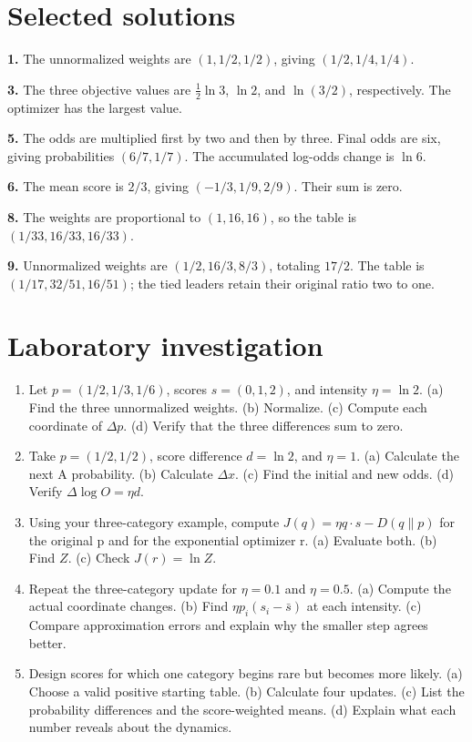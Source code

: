 \documentclass[11pt,oneside,openany]{book}
\theoremstyle{definition}
\theoremstyle{remark}
\numberwithin{equation}{chapter}
\providecommand{\tightlist}{\setlength{\itemsep}{0pt}\setlength{\parskip}{0pt}}
\newcommand{\labheading}{\FloatBarrier\section*{Laboratory investigation}\addcontentsline{toc}{section}{Laboratory investigation}}
\begin{document}
\section{Selected solutions}\label{ch09-selected-solutions}

\textbf{1.} The unnormalized weights are \((1,1/2,1/2)\), giving \((1/2,1/4,1/4)\).

\textbf{3.} The three objective values are \(\tfrac12\ln3\), \(\ln2\), and \(\ln(3/2)\), respectively. The optimizer has the largest value.

\textbf{5.} The odds are multiplied first by two and then by three. Final odds are six, giving probabilities \((6/7,1/7)\). The accumulated log-odds change is \(\ln6\).

\textbf{6.} The mean score is \(2/3\), giving \((-1/3,1/9,2/9)\). Their sum is zero.

\textbf{8.} The weights are proportional to \((1,16,16)\), so the table is \((1/33,16/33,16/33)\).

\textbf{9.} Unnormalized weights are \((1/2,16/3,8/3)\), totaling \(17/2\). The table is \((1/17,32/51,16/51)\); the tied leaders retain their original ratio two to one.
\labheading\begin{enumerate}
\def\labelenumi{\arabic{enumi}.}
\tightlist
\item
  Let \(p=(1/2,1/3,1/6)\), scores \(s=(0,1,2)\), and intensity \(\eta=\ln2\). (a) Find the three unnormalized weights. (b) Normalize. (c) Compute each coordinate of \(\Delta p\). (d) Verify that the three differences sum to zero.
\item
  Take \(p=(1/2,1/2)\), score difference \(d=\ln2\), and \(\eta=1\). (a) Calculate the next A probability. (b) Calculate \(\Delta x\). (c) Find the initial and new odds. (d) Verify \(\Delta\log O=\eta d\).
\item
  Using your three-category example, compute \(J(q)=\eta q\cdot s-D(q\|p)\) for the original p and for the exponential optimizer r. (a) Evaluate both. (b) Find \(Z\). (c) Check \(J(r)=\ln Z\).
\item
  Repeat the three-category update for \(\eta=0.1\) and \(\eta=0.5\). (a) Compute the actual coordinate changes. (b) Find \(\eta p_i(s_i-\bar s)\) at each intensity. (c) Compare approximation errors and explain why the smaller step agrees better.
\item
  Design scores for which one category begins rare but becomes more likely. (a) Choose a valid positive starting table. (b) Calculate four updates. (c) List the probability differences and the score-weighted means. (d) Explain what each number reveals about the dynamics.
\end{enumerate}

\FloatBarrier
\end{document}
